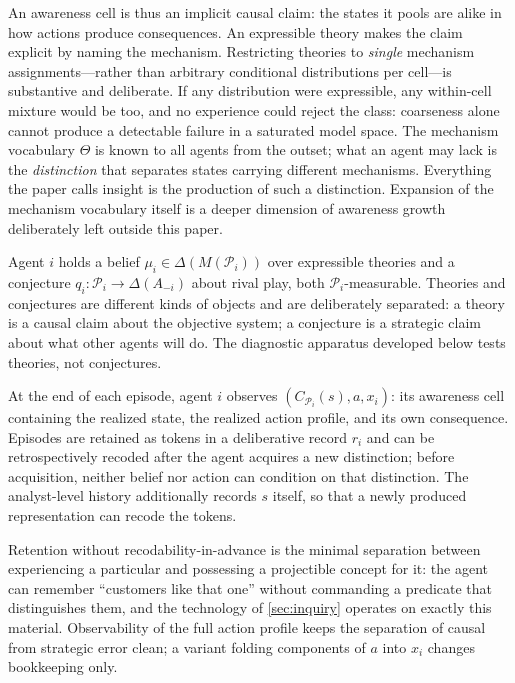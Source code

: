 An awareness cell is thus an implicit causal claim: the states it pools are
alike in how actions produce consequences.  An expressible theory makes the
claim explicit by naming the mechanism.  Restricting theories to
\emph{single} mechanism assignments---rather than arbitrary conditional
distributions per cell---is substantive and deliberate.  If any distribution
were expressible, any within-cell mixture would be too, and no experience
could reject the class: coarseness alone cannot produce a detectable failure
in a saturated model space.  The mechanism vocabulary $\Theta$ is known to
all agents from the outset; what an agent may lack is the \emph{distinction}
that separates states carrying different mechanisms.  Everything the paper
calls insight is the production of such a distinction.  Expansion of the
mechanism vocabulary itself is a deeper dimension of awareness growth
deliberately left outside this paper.

Agent $i$ holds a belief $\mu_i\in\Delta(M(\mathcal P_i))$ over expressible
theories and a conjecture $q_i:\mathcal P_i\to\Delta(A_{-i})$ about rival
play, both $\mathcal P_i$-measurable.  Theories and conjectures are different
kinds of objects and are deliberately separated: a theory is a causal claim
about the objective system; a conjecture is a strategic claim about what
other agents will do.  The diagnostic apparatus developed below tests
theories, not conjectures.

\begin{assumption}
\label{ass:observation}
At the end of each episode, agent $i$ observes
$(C_{\mathcal P_i}(s),a,x_i)$: its awareness cell containing the realized
state, the realized action profile, and its own consequence.  Episodes are
retained as tokens in a deliberative record $r_i$ and can be retrospectively
recoded after the agent acquires a new distinction; before acquisition,
neither belief nor action can condition on that distinction.  The
analyst-level history additionally records $s$ itself, so that a newly
produced representation can recode the tokens.
\end{assumption}

Retention without recodability-in-advance is the minimal separation between
experiencing a particular and possessing a projectible concept for it: the
agent can remember ``customers like that one'' without commanding a predicate
that distinguishes them, and the technology of \cref{sec:inquiry} operates on
exactly this material.  Observability of the full action profile keeps the
separation of causal from strategic error clean; a variant folding components
of $a$ into $x_i$ changes bookkeeping only.

